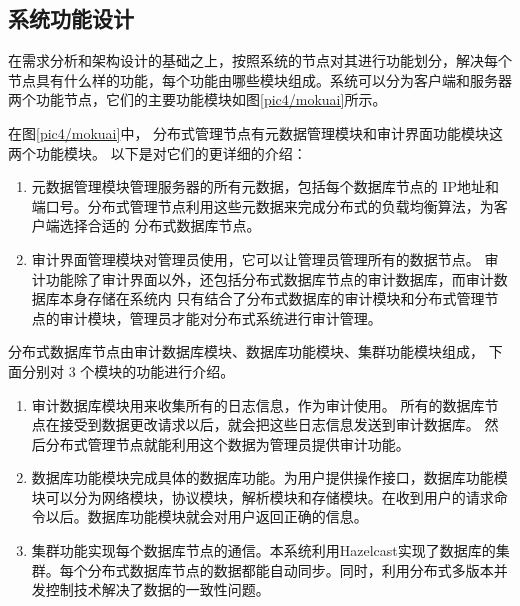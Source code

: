\subsection{系统功能设计}
在需求分析和架构设计的基础之上，按照系统的节点对其进行功能划分，解决每个节点具有什么样的功能，每个功能由哪些模块组成。系统可以分为客户端和服务器两个功能节点，它们的主要功能模块如图\ref{pic4/mokuai}所示。

在图\ref{pic4/mokuai}中，
分布式管理节点有元数据管理模块和审计界面功能模块这两个功能模块。
以下是对它们的更详细的介绍：
\begin{enumerate}[fullwidth,itemindent=2em,listparindent=2em]
	\item 元数据管理模块管理服务器的所有元数据，包括每个数据库节点的
	IP地址和端口号。分布式管理节点利用这些元数据来完成分布式的负载均衡算法，为客户端选择合适的
	分布式数据库节点。
	\item 审计界面管理模块对管理员使用，它可以让管理员管理所有的数据节点。
	审计功能除了审计界面以外，还包括分布式数据库节点的审计数据库，而审计数据库本身存储在系统内
	只有结合了分布式数据库的审计模块和分布式管理节点的审计模块，管理员才能对分布式系统进行审计管理。
\end{enumerate}

分布式数据库节点由审计数据库模块、数据库功能模块、集群功能模块组成，
 下面分别对 3 个模块的功能进行介绍。
 \begin{enumerate}[fullwidth,itemindent=2em,listparindent=2em]
 	\item 审计数据库模块用来收集所有的日志信息，作为审计使用。
 	所有的数据库节点在接受到数据更改请求以后，就会把这些日志信息发送到审计数据库。
 	然后分布式管理节点就能利用这个数据为管理员提供审计功能。
 	\item 数据库功能模块完成具体的数据库功能。为用户提供操作接口，数据库功能模块可以分为网络模块，协议模块，解析模块和存储模块。在收到用户的请求命令以后。数据库功能模块就会对用户返回正确的信息。
 	\item 集群功能实现每个数据库节点的通信。本系统利用Hazelcast实现了数据库的集群。每个分布式数据库节点的数据都能自动同步。同时，利用分布式多版本并发控制技术解决了数据的一致性问题。
 \end{enumerate}
